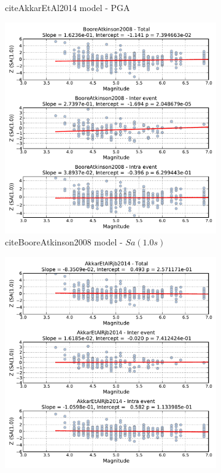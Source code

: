 \begin{figure}[htb]
\begin{subfigure}[b]{0.49\textwidth}
      \caption{citeAkkarEtAl2014 model - PGA}
      \label{fig:pga_mag_akkar2014}
  \end{subfigure}
    \begin{subfigure}[b]{0.49\textwidth}
      \includegraphics[width=\textwidth]{./figures/residuals/BA2008_Magnitude_Sa1.pdf}
      \caption{citeBooreAtkinson2008 model - $Sa \left( {1.0 s} \right)$}
      \label{fig:sa1_mag_ba2008}
  \end{subfigure}
      \begin{subfigure}[b]{0.49\textwidth}
      \includegraphics[width=\textwidth]{./figures/residuals/Akkar2014_Magnitude_Sa1.pdf}

\end{subfigure}
\end{figure}
